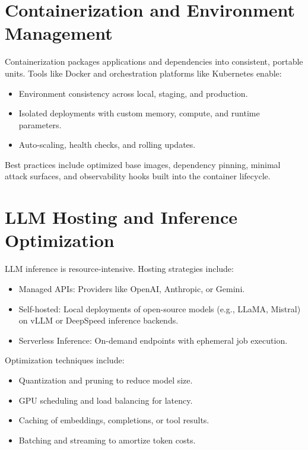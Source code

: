\documentclass{book}
\begin{document}
\section{Containerization and Environment Management}

Containerization packages applications and dependencies into consistent, portable units. Tools like Docker and orchestration platforms like Kubernetes enable:

\begin{itemize}
  \item Environment consistency across local, staging, and production.
  \item Isolated deployments with custom memory, compute, and runtime parameters.
  \item Auto-scaling, health checks, and rolling updates.
\end{itemize}

Best practices include optimized base images, dependency pinning, minimal attack surfaces, and observability hooks built into the container lifecycle.

\section{LLM Hosting and Inference Optimization}

LLM inference is resource-intensive. Hosting strategies include:

\begin{itemize}
  \item Managed APIs: Providers like OpenAI, Anthropic, or Gemini.
  \item Self-hosted: Local deployments of open-source models (e.g., LLaMA, Mistral) on vLLM or DeepSpeed inference backends.
  \item Serverless Inference: On-demand endpoints with ephemeral job execution.
\end{itemize}

Optimization techniques include:

\begin{itemize}
  \item Quantization and pruning to reduce model size.
  \item GPU scheduling and load balancing for latency.
  \item Caching of embeddings, completions, or tool results.
  \item Batching and streaming to amortize token costs.
\end{itemize}
\end{document}
